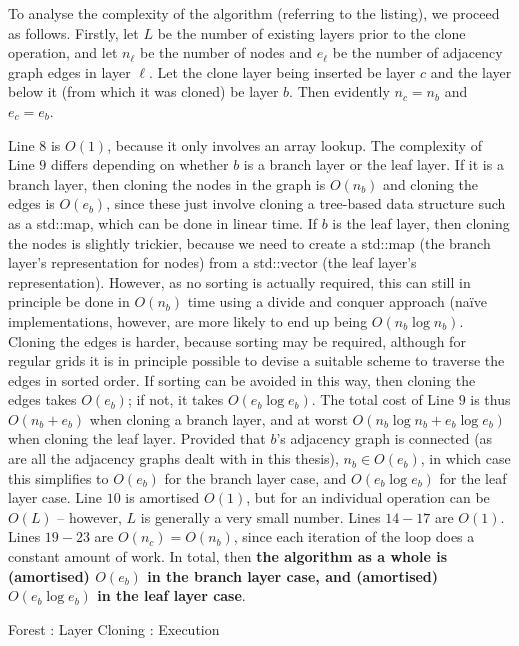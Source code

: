 To analyse the complexity of the algorithm (referring to the listing), we proceed as follows. Firstly, let $L$ be the number of existing layers prior to the clone operation, and let $n_\ell$ be the number of nodes and $e_\ell$ be the number of adjacency graph edges in layer $\ell$. Let the clone layer being inserted be layer $c$ and the layer below it (from which it was cloned) be layer $b$. Then evidently $n_c = n_b$ and $e_c = e_b$.

Line $8$ is $O(1)$, because it only involves an array lookup. The complexity of Line $9$ differs depending on whether $b$ is a branch layer or the leaf layer. If it is a branch layer, then cloning the nodes in the graph is $O(n_b)$ and cloning the edges is $O(e_b)$, since these just involve cloning a tree-based data structure such as a std::map, which can be done in linear time. If $b$ is the leaf layer, then cloning the nodes is slightly trickier, because we need to create a std::map (the branch layer's representation for nodes) from a std::vector (the leaf layer's representation). However, as no sorting is actually required, this can still in principle be done in $O(n_b)$ time using a divide and conquer approach (na\"ive implementations, however, are more likely to end up being $O(n_b \log n_b)$. Cloning the edges is harder, because sorting may be required, although for regular grids it is in principle possible to devise a suitable scheme to traverse the edges in sorted order. If sorting can be avoided in this way, then cloning the edges takes $O(e_b)$; if not, it takes $O(e_b \log e_b)$. The total cost of Line $9$ is thus $O(n_b + e_b)$ when cloning a branch layer, and at worst $O(n_b \log n_b + e_b \log e_b)$ when cloning the leaf layer. Provided that $b$'s adjacency graph is connected (as are all the adjacency graphs dealt with in this thesis), $n_b \in O(e_b)$, in which case this simplifies to $O(e_b)$ for the branch layer case, and $O(e_b \log e_b)$ for the leaf layer case. Line $10$ is amortised $O(1)$, but for an individual operation can be $O(L)$ -- however, $L$ is generally a very small number. Lines $14-17$ are $O(1)$. Lines $19-23$ are $O(n_c) = O(n_b)$, since each iteration of the loop does a constant amount of work. In total, then \textbf{the algorithm as a whole is (amortised) $O(e_b)$ in the branch layer case, and (amortised) $O(e_b \log e_b)$ in the leaf layer case}.

\begin{stulisting}[p]
\caption{Forest : Layer Cloning : Execution}
\label{code:ipfs-forest-clonelayerimpl}

\end{stulisting}

